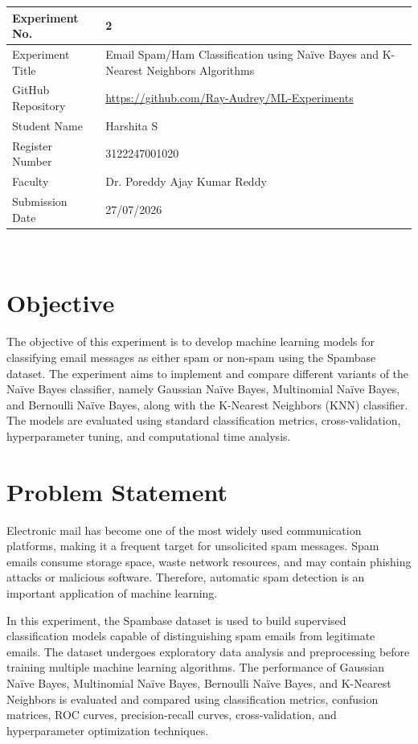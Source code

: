 \documentclass[12pt,a4paper]{article}
\begin{document}
	
	\begin{tabular}{|p{4cm}|p{11cm}|}
		\hline
		
		Experiment No. & 2 \\ \hline
		
		Experiment Title & Email Spam/Ham Classification using Na\"ive Bayes and K-Nearest Neighbors Algorithms \\ \hline 
		GitHub Repository & \url{https://github.com/Ray-Audrey/ML-Experiments} \\ \hline 
		Student Name & Harshita S \\ \hline
		
		Register Number & 3122247001020 \\ \hline
		
		Faculty & Dr. Poreddy Ajay Kumar Reddy \\ \hline
		
		Submission Date & 27/07/2026 \\ \hline
		
	\end{tabular}
	\\
	
	\section{Objective}
	
	The objective of this experiment is to develop machine learning models for classifying email messages as either spam or non-spam using the Spambase dataset. The experiment aims to implement and compare different variants of the Na\"ive Bayes classifier, namely Gaussian Na\"ive Bayes, Multinomial Na\"ive Bayes, and Bernoulli Na\"ive Bayes, along with the K-Nearest Neighbors (KNN) classifier. The models are evaluated using standard classification metrics, cross-validation, hyperparameter tuning, and computational time analysis.
	
	\section{Problem Statement}
	
	Electronic mail has become one of the most widely used communication platforms, making it a frequent target for unsolicited spam messages. Spam emails consume storage space, waste network resources, and may contain phishing attacks or malicious software. Therefore, automatic spam detection is an important application of machine learning.
	
	In this experiment, the Spambase dataset is used to build supervised classification models capable of distinguishing spam emails from legitimate emails. The dataset undergoes exploratory data analysis and preprocessing before training multiple machine learning algorithms. The performance of Gaussian Na\"ive Bayes, Multinomial Na\"ive Bayes, Bernoulli Na\"ive Bayes, and K-Nearest Neighbors is evaluated and compared using classification metrics, confusion matrices, ROC curves, precision-recall curves, cross-validation, and hyperparameter optimization techniques.
	
\end{document}
